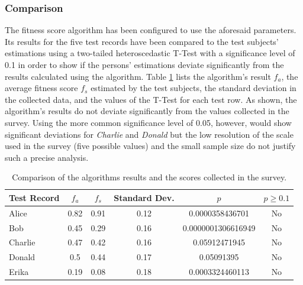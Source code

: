 \subsubsection{Comparison}
The fitness score algorithm has been configured to use the aforesaid parameters. Its results for the five test records have been compared to the test subjects'
estimations using a two-tailed heteroscedastic T-Test with a significance level of 0.1 in order to show if the persons' estimations deviate significantly from the results calculated using the algorithm. Table \ref{tab:survey_ttest} lists the algorithm's result $f_a$, the average fitness score $f_s$ estimated by the test subjects, the standard deviation in the collected data, and the values of the T-Test for each test row. As shown, the algorithm's results do not deviate significantly from the values collected in the survey. Using the more common significance level of 0.05, however, would show significant deviations for \textit{Charlie} and \textit{Donald} but the low resolution of the scale used in the survey (five possible values) and the small sample size do not justify such a precise analysis.

\begin{table}[htp]
\centering
\begin{tabular}{l||c||c|c||c|c}
Test Record & $f_a$ & $f_s$ & Standard Dev. & $p$ & $p \ge 0.1$\\
\hline
Alice       & 0.82 & 0.91 & 0.12 & 0.0000358436701 & No\\
Bob         & 0.45 & 0.29 & 0.16 & 0.0000001306616949 & No\\
Charlie     & 0.47 & 0.42 & 0.16 & 0.05912471945 & No\\
Donald      & 0.5  & 0.44 & 0.17 & 0.05091395 & No\\
Erika       & 0.19 & 0.08 & 0.18 & 0.0003324460113 & No\\
\end{tabular}
\caption[Survey: Comparison of Algorithm and Survey]{Comparison of the algorithms results and the scores collected in the survey.}
\label{tab:survey_ttest}
\end{table}

